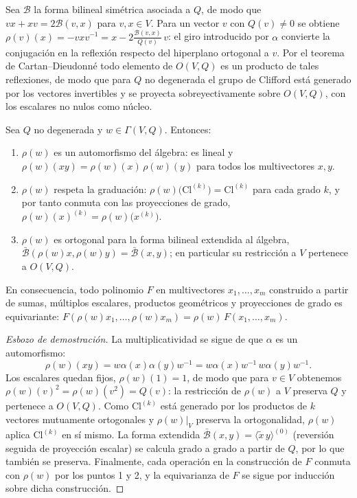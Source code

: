 Sea $\mathcal{B}$ la forma bilineal simétrica asociada a $Q$, de modo que $vx + xv = 2\mathcal{B}(v,x)$ para $v, x \in V$. Para un vector $v$ con $Q(v) \neq 0$ se obtiene $\rho(v)(x) = -vxv^{-1} = x - 2\frac{\mathcal{B}(v,x)}{Q(v)}\,v$: el giro introducido por $\alpha$ convierte la conjugación en la reflexión respecto del hiperplano ortogonal a $v$. Por el teorema de Cartan--Dieudonn\'e todo elemento de $O(V,Q)$ es un producto de tales reflexiones, de modo que para $Q$ no degenerada el grupo de Clifford está generado por los vectores invertibles y se proyecta sobreyectivamente sobre $O(V,Q)$, con los escalares no nulos como núcleo.

\begin{proposition}\label{prop:equivarianza_grupo_clifford}
Sea $Q$ no degenerada y $w \in \Gamma(V,Q)$. Entonces:
\begin{enumerate}
    \item $\rho(w)$ es un automorfismo del álgebra: es lineal y $\rho(w)(xy) = \rho(w)(x)\,\rho(w)(y)$ para todos los multivectores $x, y$.
    \item $\rho(w)$ respeta la graduación: $\rho(w)\big(\text{Cl}^{(k)}\big) = \text{Cl}^{(k)}$ para cada grado $k$, y por tanto conmuta con las proyecciones de grado, $\rho(w)(x)^{(k)} = \rho(w)\big(x^{(k)}\big)$.
    \item $\rho(w)$ es ortogonal para la forma bilineal extendida al álgebra, $\bar{\mathcal{B}}(\rho(w)x, \rho(w)y) = \bar{\mathcal{B}}(x,y)$; en particular su restricción a $V$ pertenece a $O(V,Q)$.
\end{enumerate}
En consecuencia, todo polinomio $F$ en multivectores $x_1, \dots, x_m$ construido a partir de sumas, múltiplos escalares, productos geométricos y proyecciones de grado es equivariante: $F(\rho(w)x_1, \dots, \rho(w)x_m) = \rho(w)\,F(x_1,\dots,x_m)$.
\end{proposition}

\begin{proof}[Esbozo de demostración]
La multiplicatividad se sigue de que $\alpha$ es un automorfismo: 
\[\rho(w)(xy) = w\alpha(x)\alpha(y)w^{-1} = w\alpha(x)w^{-1}\,w\alpha(y)w^{-1}.\] Los escalares quedan fijos, $\rho(w)(1) = 1$, de modo que para $v \in V$ obtenemos $\rho(w)(v)^2 = \rho(w)(v^2) = Q(v)$: la restricción de $\rho(w)$ a $V$ preserva $Q$ y pertenece a $O(V,Q)$. Como $\text{Cl}^{(k)}$ está generado por los productos de $k$ vectores mutuamente ortogonales y $\rho(w)|_V$ preserva la ortogonalidad, $\rho(w)$ aplica $\text{Cl}^{(k)}$ en sí mismo. La forma extendida $\bar{\mathcal{B}}(x,y) = \langle \tilde{x}\,y \rangle^{(0)}$ (reversión seguida de proyección escalar) se calcula grado a grado a partir de $Q$, por lo que también se preserva. Finalmente, cada operación en la construcción de $F$ conmuta con $\rho(w)$ por los puntos 1 y 2, y la equivarianza de $F$ se sigue por inducción sobre dicha construcción.
\end{proof}


